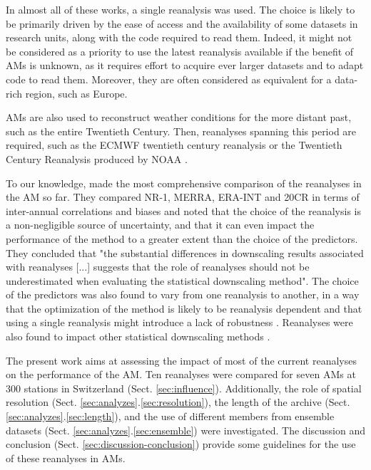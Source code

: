 \documentclass{ametsoc}
\begin{document}
	In almost all of these works, a single reanalysis was used. The choice is likely to be primarily driven by the ease of access and the availability of some datasets in research units, along with the code required to read them. Indeed, it might not be considered as a priority to use the latest reanalysis available if the benefit of AMs is unknown, as it requires effort to acquire ever larger datasets and to adapt code to read them. Moreover, they are often considered as equivalent for a data-rich region, such as Europe.
	
	AMs are also used to reconstruct weather conditions for the more distant past, such as the entire Twentieth Century. Then, reanalyses spanning this period are required, such as the ECMWF twentieth century reanalysis \citep[ERA-20C --][]{Poli2016} or the Twentieth Century Reanalysis \citep[20CR --][]{Compo2011} produced by NOAA \citep[for example,][]{Kuentz2015, Caillouet2016, Brigode2016, Bonnet2017}. 
	
	To our knowledge, \citet{Dayon2015} made the most comprehensive comparison of the reanalyses in the AM so far. They compared NR-1, MERRA, ERA-INT and 20CR in terms of inter-annual correlations and biases and noted that the choice of the reanalysis is a non-negligible source of uncertainty, and that it can even impact the performance of the method to a greater extent than the choice of the predictors. They concluded that "the substantial differences in downscaling results associated with reanalyses [...] suggests that the role of reanalyses should not be underestimated when evaluating the statistical downscaling method". The choice of the predictors was also found to vary from one reanalysis to another, in a way that the optimization of the method is likely to be reanalysis dependent and that using a single reanalysis might introduce a lack of robustness \citep{Dayon2015}. Reanalyses were also found to impact other statistical downscaling methods \citep[e.g.][]{Koukidis2009}.
	
	The present work aims at assessing the impact of most of the current reanalyses on the performance of the AM. Ten reanalyses were compared for seven AMs at 300 stations in Switzerland (Sect. \ref{sec:influence}). Additionally, the role of spatial resolution (Sect. \ref{sec:analyzes}.\ref{sec:resolution}), the length of the archive (Sect. \ref{sec:analyzes}.\ref{sec:length}), and the use of different members from ensemble datasets (Sect. \ref{sec:analyzes}.\ref{sec:ensemble}) were investigated. The discussion and conclusion (Sect. \ref{sec:discussion-conclusion}) provide some guidelines for the use of these reanalyses in AMs.
	
\end{document}

